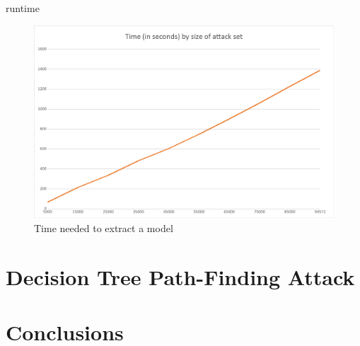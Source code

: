 \documentclass[10pt]{beamer}
\begin{document}
\begin{frame}[fragile]{runtime}
    \begin{figure}[h!]
        \centering      \includegraphics[scale=0.4]{exercise_3/paper/images/Time_copy_cat.png}
        \caption{Time needed to extract a model}
        \label{fig:time_cat}
    \end{figure}
\end{frame}
\section{Decision Tree Path-Finding Attack}
\section{Conclusions}
\end{document}
